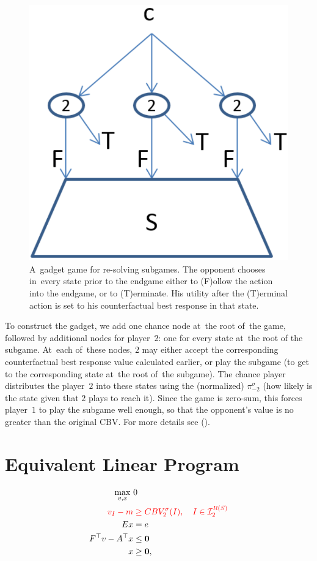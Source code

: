 \begin{figure}[H]
  \centering
  \includegraphics[width=.3\textwidth]{../img/re-solving-game-gadget.png}
  \def\captionTitle{A~gadget game for re-solving subgames}
  \caption[\captionTitle]{
    \captionTitle.
    The opponent chooses in~every state prior to the endgame either to (F)ollow the action into the endgame, or to (T)erminate.
    His utility after the (T)erminal action is set to his counterfactual best response in that state.
  }
  \label{fig:re-solving-gadget}
\end{figure}

To construct the gadget, we add one chance node at~the root of~the game, followed by additional nodes for player~$2$:
one for every state at~the root of the subgame.
At~each of~these nodes, $2$ may either accept the corresponding counterfactual best response value calculated earlier, or play the subgame (to get to the corresponding state at~the root of~the subgame).
The chance player distributes the player~$2$ into these states using the (normalized) $\pi^\sigma_{-2}$ (how likely is the state given that $2$ plays to reach it).
Since the game is zero-sum, this forces player~$1$ to play the subgame well enough, so that the opponent's value is no greater than the original CBV.
For more details see (\cite{BurchJohansonBowling13}).

\section{Equivalent Linear Program}
\begin{equation}
  \label{lp:cfr-d}
  \begin{split}
    \max_{v, x}\ &0 \\
    \color{red}
      v_I - m &
    \color{red}
      \ge CBV_2^\sigma(I), \quad I \in \mathcal{I}_2^{R(S)}\\ 
    Ex &= e \\
    F^\top v - A^\top x &\le \boldsymbol{0} \\
    x &\ge \boldsymbol{0},
  \end{split}
\end{equation}


